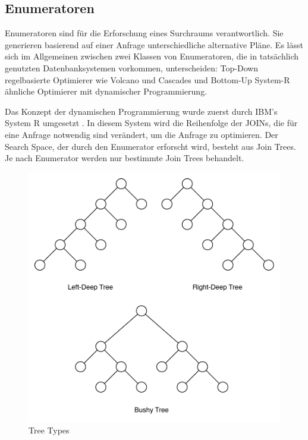 \subsection{Enumeratoren}



Enumeratoren sind für die Erforschung eines Surchraums verantwortlich. Sie generieren basierend auf einer Anfrage unterschiedliche alternative Pläne. Es lässt sich im Allgemeinen zwischen zwei Klassen von Enumeratoren, die in tatsächlich genutzten Datenbanksystemen vorkommen, unterscheiden: Top-Down regelbasierte Optimierer wie Volcano und Cascades und Bottom-Up System-R ähnliche Optimierer mit dynamischer Programmierung. \cite{li2007enabling}

Das Konzept der dynamischen Programmierung wurde zuerst durch IBM's System R umgesetzt \cite{selinger1979access}. In diesem System wird die Reihenfolge der JOINs, die für eine Anfrage notwendig sind verändert, um die Anfrage zu optimieren. Der Search Space, der durch den Enumerator erforscht wird, besteht aus Join Trees. Je nach Enumerator werden nur bestimmte Join Trees behandelt.


\begin{figure}[h]
  \centering
  \includegraphics[scale=0.75]{02_Related_Work/TreeTypes.pdf}
  \caption{Tree Types}
  \label{TreeTypes}
\end{figure}

